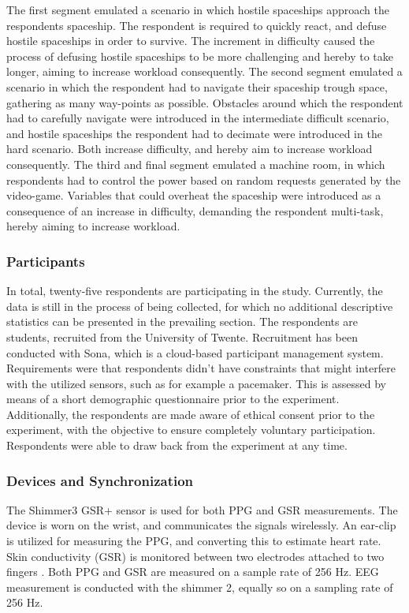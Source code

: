 \documentclass{article}
\begin{document}
\egroup

The first segment emulated a scenario in which hostile spaceships approach the respondents spaceship. The respondent is required to  quickly react, and defuse hostile spaceships in order to survive. The increment in difficulty caused the process of defusing hostile spaceships to be more challenging and hereby to take longer,  aiming to increase workload consequently. The second segment emulated a scenario in which the respondent had to navigate their spaceship trough space, gathering as many way-points as possible. Obstacles around which the respondent had to carefully navigate were introduced in the intermediate difficult scenario, and hostile spaceships the respondent had to decimate were introduced in the hard scenario. Both increase difficulty, and hereby aim to increase workload consequently. The third and final segment emulated a machine room, in which respondents had to control the power based on random requests generated by the video-game. Variables that could overheat the spaceship  were introduced as a consequence of an increase in difficulty, demanding the respondent multi-task, hereby aiming to increase workload. 

\subsubsection{Participants}
In total, twenty-five respondents are participating in the study. Currently, the data is still in the process of being collected, for which no additional descriptive statistics can be presented in the prevailing section. The respondents are students, recruited from the University of Twente. Recruitment has been conducted with Sona, which is a cloud-based participant management system. Requirements were that respondents didn't have constraints that might interfere with the utilized sensors, such as for example a pacemaker. This is assessed by means of a short demographic questionnaire prior to the experiment. Additionally, the respondents are made aware of ethical consent prior to the experiment, with the objective to ensure completely voluntary participation. Respondents were able to draw back from the experiment at any time. 

\subsubsection{Devices and Synchronization}
The Shimmer3 GSR+ sensor is used for both PPG and GSR measurements. The device is worn on the wrist, and communicates the signals wirelessly. An ear-clip is utilized for measuring the PPG, and converting this to estimate heart rate. Skin conductivity (GSR) is monitored between two electrodes attached to two fingers \cite{shimmer}. Both PPG and GSR are measured on a sample rate of 256 Hz. EEG measurement is conducted with the shimmer 2, equally so on a sampling rate of 256 Hz. 
\end{document}
